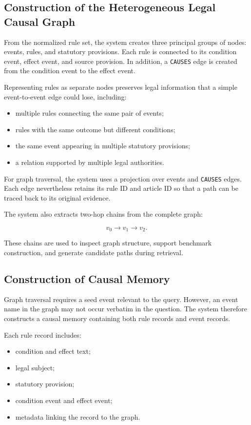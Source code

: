 \subsection{Construction of the Heterogeneous Legal Causal Graph}

From the normalized rule set, the system creates three principal groups of
nodes: events, rules, and statutory provisions. Each rule is connected to
its condition event, effect event, and source provision. In addition, a
\texttt{CAUSES} edge is created from the condition event to the effect event.

Representing rules as separate nodes preserves legal information that a
simple event-to-event edge could lose, including:

\begin{itemize}
    \item multiple rules connecting the same pair of events;
    \item rules with the same outcome but different conditions;
    \item the same event appearing in multiple statutory provisions;
    \item a relation supported by multiple legal authorities.
\end{itemize}

For graph traversal, the system uses a projection over events and
\texttt{CAUSES} edges. Each edge nevertheless retains its rule ID and article
ID so that a path can be traced back to its original evidence.

The system also extracts two-hop chains from the complete graph:

\[
v_0 \rightarrow v_1 \rightarrow v_2.
\]

These chains are used to inspect graph structure, support benchmark
construction, and generate candidate paths during retrieval.

\subsection{Construction of Causal Memory}

Graph traversal requires a seed event relevant to the query. However, an
event name in the graph may not occur verbatim in the question. The system
therefore constructs a causal memory containing both rule records and event
records.

Each rule record includes:

\begin{itemize}
    \item condition and effect text;
    \item legal subject;
    \item statutory provision;
    \item condition event and effect event;
    \item metadata linking the record to the graph.
\end{itemize}

